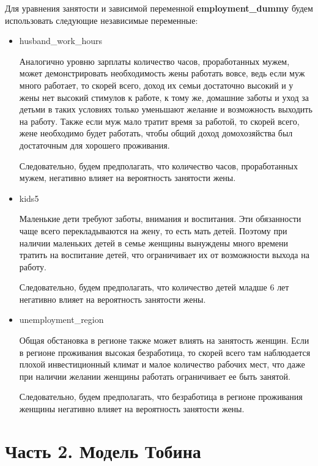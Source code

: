 \documentclass[a4paper,12pt]{article}
\begin{document}
	
	
	Для уравнения занятости и зависимой переменной \textbf{employment\_dummy} будем использовать следующие независимые переменные:
	
	\begin{itemize}
		\item husband\_work\_hours
		
		Аналогично уровню зарплаты количество часов, проработанных мужем, может демонстрировать необходимость жены работать вовсе, ведь если муж много работает, то скорей всего, доход их семьи достаточно высокий и у жены нет высокий стимулов к работе, к тому же, домашние заботы и уход за детьми в таких условиях только уменьшают желание и возможность выходить на работу. Также если муж мало тратит время за работой, то скорей всего, жене необходимо будет работать, чтобы общий доход домохозяйства был достаточным для хорошего проживания. 
		
		Следовательно, будем предполагать, что количество часов, проработанных мужем, негативно влияет на вероятность занятости жены.
		
		\item kids5
		
		Маленькие дети требуют заботы, внимания и воспитания. Эти обязанности чаще всего перекладываются на жену, то есть мать детей. Поэтому при наличии маленьких детей в семье женщины вынуждены много времени тратить на воспитание детей, что ограничивает их от возможности выхода на работу. 
		
		Следовательно, будем предполагать, что количество детей младше 6 лет негативно влияет на вероятность занятости жены.
		
		\item unemployment\_region
		
		Общая обстановка в регионе также может влиять на занятость женщин. Если в регионе проживания высокая безработица, то скорей всего там наблюдается плохой инвестиционный климат и малое количество рабочих мест, что даже при наличии желании женщины работать ограничивает ее быть занятой. 
		
		Следовательно, будем предполагать, что безработица в регионе проживания женщины негативно влияет на вероятность занятости жены.
		
	\end{itemize}
	
	\newpage
	
	\section{Часть 2. Модель Тобина}
	
\end{document}
